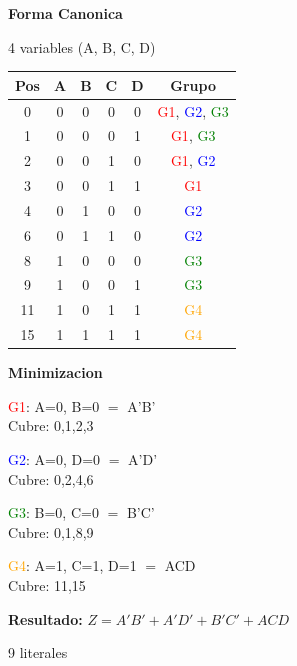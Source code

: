 \documentclass[12pt,a4paper]{article}
\begin{document}
\vspace{0.3cm}

\begin{minipage}[t]{0.58\textwidth}
\textbf{Forma Canonica}

4 variables (A, B, C, D)

\begin{tabular}{|c|c|c|c|c|c|}
\hline
Pos & A & B & C & D & Grupo \\
\hline
0  & 0 & 0 & 0 & 0 & \textcolor{red}{G1}, \textcolor{blue}{G2}, \textcolor{green}{G3} \\
1  & 0 & 0 & 0 & 1 & \textcolor{red}{G1}, \textcolor{green}{G3} \\
2  & 0 & 0 & 1 & 0 & \textcolor{red}{G1}, \textcolor{blue}{G2} \\
3  & 0 & 0 & 1 & 1 & \textcolor{red}{G1} \\
4  & 0 & 1 & 0 & 0 & \textcolor{blue}{G2} \\
6  & 0 & 1 & 1 & 0 & \textcolor{blue}{G2} \\
8  & 1 & 0 & 0 & 0 & \textcolor{green}{G3} \\
9  & 1 & 0 & 0 & 1 & \textcolor{green}{G3} \\
11 & 1 & 0 & 1 & 1 & \textcolor{orange}{G4} \\
15 & 1 & 1 & 1 & 1 & \textcolor{orange}{G4} \\
\hline
\end{tabular}
\end{minipage}
\hspace{0.3cm}
\begin{minipage}[t]{0.38\textwidth}
\textbf{Minimizacion}

\vspace{0.2cm}
\textcolor{red}{G1}: A=0, B=0 $=$ A'B' \\ Cubre: 0,1,2,3

\vspace{0.2cm}
\textcolor{blue}{G2}: A=0, D=0 $=$ A'D' \\ Cubre: 0,2,4,6

\vspace{0.2cm}
\textcolor{green}{G3}: B=0, C=0 $=$ B'C' \\ Cubre: 0,1,8,9

\vspace{0.2cm}
\textcolor{orange}{G4}: A=1, C=1, D=1 $=$ ACD \\ Cubre: 11,15

\vspace{0.3cm}
\textbf{Resultado:} $Z = A'B' + A'D' + B'C' + ACD$

9 literales
\end{minipage}
\end{document}
